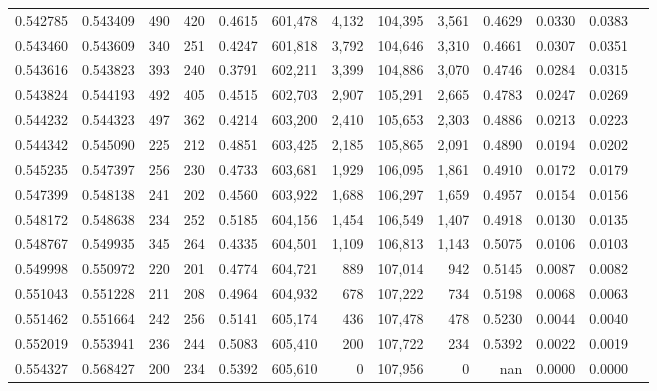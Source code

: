 \begin{tabular}{rrrrrrrrrrrrr}
0.542785 & 0.543409 &   490 &   420 &                                     0.4615 & 601,478 &   4,132 & 104,395 &   3,561 & 0.4629 & 0.0330 & 0.0383 \\
0.543460 & 0.543609 &   340 &   251 &                                     0.4247 & 601,818 &   3,792 & 104,646 &   3,310 & 0.4661 & 0.0307 & 0.0351 \\
0.543616 & 0.543823 &   393 &   240 &                                     0.3791 & 602,211 &   3,399 & 104,886 &   3,070 & 0.4746 & 0.0284 & 0.0315 \\
0.543824 & 0.544193 &   492 &   405 &                                     0.4515 & 602,703 &   2,907 & 105,291 &   2,665 & 0.4783 & 0.0247 & 0.0269 \\
0.544232 & 0.544323 &   497 &   362 &                                     0.4214 & 603,200 &   2,410 & 105,653 &   2,303 & 0.4886 & 0.0213 & 0.0223 \\
0.544342 & 0.545090 &   225 &   212 &                                     0.4851 & 603,425 &   2,185 & 105,865 &   2,091 & 0.4890 & 0.0194 & 0.0202 \\
0.545235 & 0.547397 &   256 &   230 &                                     0.4733 & 603,681 &   1,929 & 106,095 &   1,861 & 0.4910 & 0.0172 & 0.0179 \\
0.547399 & 0.548138 &   241 &   202 &                                     0.4560 & 603,922 &   1,688 & 106,297 &   1,659 & 0.4957 & 0.0154 & 0.0156 \\
0.548172 & 0.548638 &   234 &   252 &                                     0.5185 & 604,156 &   1,454 & 106,549 &   1,407 & 0.4918 & 0.0130 & 0.0135 \\
0.548767 & 0.549935 &   345 &   264 &                                     0.4335 & 604,501 &   1,109 & 106,813 &   1,143 & 0.5075 & 0.0106 & 0.0103 \\
0.549998 & 0.550972 &   220 &   201 &                                     0.4774 & 604,721 &     889 & 107,014 &     942 & 0.5145 & 0.0087 & 0.0082 \\
0.551043 & 0.551228 &   211 &   208 &                                     0.4964 & 604,932 &     678 & 107,222 &     734 & 0.5198 & 0.0068 & 0.0063 \\
0.551462 & 0.551664 &   242 &   256 &                                     0.5141 & 605,174 &     436 & 107,478 &     478 & 0.5230 & 0.0044 & 0.0040 \\
0.552019 & 0.553941 &   236 &   244 &                                     0.5083 & 605,410 &     200 & 107,722 &     234 & 0.5392 & 0.0022 & 0.0019 \\
0.554327 & 0.568427 &   200 &   234 &                                     0.5392 & 605,610 &       0 & 107,956 &       0 &    nan & 0.0000 & 0.0000 \\
\bottomrule
\end{tabular}
